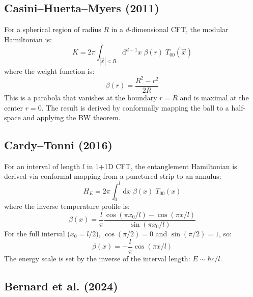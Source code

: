 \documentclass[11pt,letterpaper]{article}
\begin{document}
\subsection{Casini--Huerta--Myers (2011)}

For a spherical region of radius $R$ in a $d$-dimensional CFT, the modular
Hamiltonian is:
\begin{equation}
  K = 2\pi \int_{|\vec{x}|<R} \mathrm{d}^{d-1}x \; \beta(r) \; T_{00}(\vec{x})
  \label{eq:chm}
\end{equation}
where the weight function is:
\begin{equation}
  \beta(r) = \frac{R^2 - r^2}{2R}
  \label{eq:chm_weight}
\end{equation}
This is a parabola that vanishes at the boundary $r = R$ and is maximal at
the center $r = 0$. The result is derived by conformally mapping the ball to
a half-space and applying the BW theorem.

\subsection{Cardy--Tonni (2016)}

For an interval of length $l$ in 1+1D CFT, the entanglement Hamiltonian is
derived via conformal mapping from a punctured strip to an annulus:
\begin{equation}
  H_E = 2\pi \int_0^l \mathrm{d}x \; \beta(x) \; T_{00}(x)
  \label{eq:cardy_tonni}
\end{equation}
where the inverse temperature profile is:
\begin{equation}
  \beta(x) = \frac{l}{\pi}
  \frac{\cos(\pi x_0/l) - \cos(\pi x/l)}{\sin(\pi x_0/l)}
  \label{eq:cardy_tonni_beta}
\end{equation}
For the full interval ($x_0 = l/2$), $\cos(\pi/2) = 0$ and $\sin(\pi/2) = 1$, so:
\begin{equation}
  \beta(x) = -\frac{l}{\pi} \cos(\pi x/l)
  \label{eq:cardy_tonni_full}
\end{equation}
The energy scale is set by the inverse of the interval length: $E \sim \hbar c/l$.

\subsection{Bernard et al. (2024)}
\end{document}
